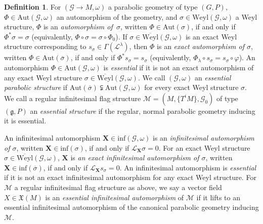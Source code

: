 \documentclass[11pt]{article}
\def\g{\mathfrak{g}}
\def\Gbdle{\mathcal{G}}
\def\VF{\mathfrak{X}}
\theoremstyle{plain}
\theoremstyle{definition}
\newtheorem{Definition}{Definition}[section]
\begin{document}
\begin{Definition} \label{parabolic essential definition} For $(\Gbdle \rightarrow M,\omega)$ a parabolic geometry of type $(G,P)$, $\Phi \in \mathrm{Aut}(\Gbdle,\omega)$ an automorphism of the geometry, and $\sigma \in \mathrm{Weyl}(\Gbdle,\omega)$ a Weyl structure, $\Phi$ is an \emph{automorphism of~$\sigma$}, written $\Phi \in \mathrm{Aut}(\sigma)$, if and only if $\Phi^*\sigma = \sigma$ (equivalently, $\Phi \circ \sigma = \sigma \circ \Phi_0$). If $\sigma \in \overline{\mathrm{Weyl}}(\Gbdle,\omega)$ is an exact Weyl structure corresponding to $s_{\sigma} \in \Gamma(\mathcal{L}^{\lambda})$, then $\Phi$ is an \emph{exact automorphism of $\sigma$}, written $\Phi \in \mathrm{Aut}(\overline{\sigma})$, if and only if $\Phi^*s_{\sigma} = s_{\sigma}$ (equivalently, $\Phi_{\lambda} \circ s_{\sigma} = s_{\sigma} \circ \varphi$). An automorphism $\Phi \in \mathrm{Aut}(\Gbdle,\omega)$ is \emph{essential} if it is not an exact automorphism of any exact Weyl structure $\sigma \in \overline{\mathrm{Weyl}}(\Gbdle,\omega)$. We call $(\Gbdle,\omega)$ an \emph{essential parabolic structure} if $\mathrm{Aut}(\overline{\sigma}) \subsetneqq \mathrm{Aut}(\Gbdle,\omega)$ for every exact Weyl structure $\sigma$. We call a regular inf\/initesimal f\/lag structure $\mathcal{M} = (M,\{T^iM\},\Gbdle_0)$ of type $(\g,P)$ an \emph{essential structure} if the regular, normal parabolic geometry inducing it is essential.


An inf\/initesimal automorphism $\mathbf{X} \in \mathrm{inf}(\Gbdle,\omega)$ is an \emph{infinitesimal automorphism of $\sigma$}, written $\mathbf{X} \in \mathrm{inf}(\sigma)$, if and only if $\mathcal{L}_{\mathbf{X}} \sigma = 0$. For an exact Weyl structure $\sigma \in \overline{\mathrm{Weyl}}(\Gbdle,\omega)$, $\mathbf{X}$ is \emph{an exact infinitesimal automorphism of $\sigma$}, written $\mathbf{X} \in \mathrm{inf}(\overline{\sigma})$, if and only if $\mathcal{L}_{\mathbf{X}} s_{\sigma} = 0$. An inf\/initesimal automorphism is \emph{essential} if it is not an exact inf\/initesimal automorphism for any exact Weyl structure. For $\mathcal{M}$ a regular inf\/initesimal f\/lag structure as above, we say a vector f\/ield $X \in \VF(M)$ is an \emph{essential infinitesimal automorphism} of $\mathcal{M}$ if it lifts to an essential inf\/initesimal automorphism of the canonical parabolic geometry inducing $\mathcal{M}$.
\end{Definition}
\end{document}
